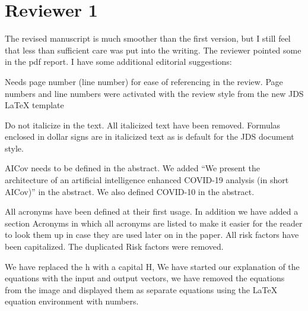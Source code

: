 \section*{Reviewer 1}

The revised manuscript is much smoother than the first version, but I
still feel that less than sufficient care was put into the
writing. The reviewer pointed some in the pdf report. I have some
additional editorial suggestions:

\bigskip


   {Needs page number (line number) for ease of
    referencing in the review.}
  {Page numbers and line numbers were
    activated with the review style from the new JDS \LaTeX{}
    template}

   {Do not italicize in the text.}
  {All italicized text
    have been removed.  Formulas enclosed in dollar signs are in
    italicized text as is default for the JDS document style.}


   {AICov needs to be defined in the abstract.}
  {We added ``We present the architecture of an artificial
    intelligence enhanced COVID-19 analysis (in short AICov)''
  in the abstract. We also defined COVID-10 in the abstract.}

  {All acronyms have been defined at their first usage. In addition
    we have added a section Acronyms in which all acronyms are listed
    to make it easier for the reader to look them up in case they are
    used later on in the paper. All risk factors have been capitalized.
    The duplicated Risk factors were removed.
  }
  

  { We have replaced the h with a capital H, We have started our explanation of the equations with the input and output vectors, we have removed the equations from the image and displayed them as separate equations using the LaTeX equation environment with numbers. }


